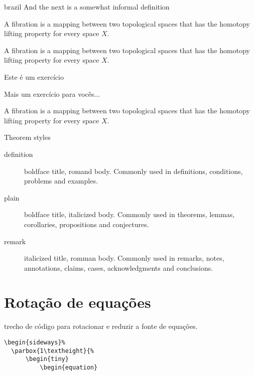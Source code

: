 \begin{otherlanguage*}{brazil}
And the next is a somewhat informal definition


\begin{definicao}[Fibration]
    A fibration is a mapping between two topological spaces that has the homotopy lifting property for every space $X$.
\end{definicao}

\begin{exemplo}[Fibration]
    A fibration is a mapping between two topological spaces that has the homotopy lifting property for every space $X$.
\end{exemplo}


\begin{exercicio}
    Este é um exercício

\end{exercicio}

\begin{exercicio}
    Mais um exercício para vocês...

\end{exercicio}


\begin{condicao}[Fibration]
    A fibration is a mapping between two topological spaces that has the homotopy lifting property for every space $X$.
\end{condicao}
Theorem styles

\begin{description}
    \item[definition] boldface title, romand body. Commonly used in definitions, conditions, problems and examples.
\item[plain] boldface title, italicized body. Commonly used in theorems, lemmas, corollaries, propositions and conjectures.
\item[remark] italicized title, romman body. Commonly used in remarks, notes, annotations, claims, cases, acknowledgments and conclusions.
\end{description}


\section{Rotação de equações}

trecho de código para rotacionar e reduzir a fonte de equações.

\begin{verbatim}
\begin{sideways}%
  \parbox{1\textheight}{%
      \begin{tiny}
          \begin{equation}


\end{verbatim}
\end{otherlanguage*}
